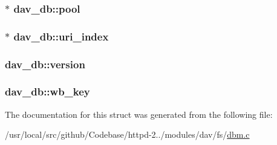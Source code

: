 \subsubsection[{\texorpdfstring{pool}{pool}}]{$\ast$ dav\+\_\+db\+::pool}\hypertarget{structdav__db_abdc510467d96807a3a9126b408ce2cfe}{}\label{structdav__db_abdc510467d96807a3a9126b408ce2cfe}
\subsubsection[{\texorpdfstring{uri\+\_\+index}{uri_index}}]{$\ast$ dav\+\_\+db\+::uri\+\_\+index}\hypertarget{structdav__db_ac73ba0df7375febb3fd32baec03714a1}{}\label{structdav__db_ac73ba0df7375febb3fd32baec03714a1}
\subsubsection[{\texorpdfstring{version}{version}}]{ dav\+\_\+db\+::version}\hypertarget{structdav__db_a2703c564ab6767305b64972df53fde27}{}\label{structdav__db_a2703c564ab6767305b64972df53fde27}
\subsubsection[{\texorpdfstring{wb\+\_\+key}{wb_key}}]{ dav\+\_\+db\+::wb\+\_\+key}\hypertarget{structdav__db_a17375a25f98cd2f5edd4b133803dab70}{}\label{structdav__db_a17375a25f98cd2f5edd4b133803dab70}


The documentation for this struct was generated from the following file\+:\begin{DoxyCompactItemize}
\item 
/usr/local/src/github/\+Codebase/httpd-\/2../modules/dav/fs/\hyperlink{dbm_8c}{dbm.\+c}\end{DoxyCompactItemize}

